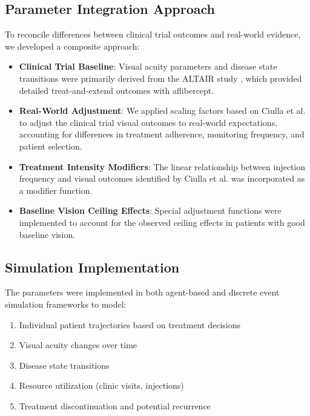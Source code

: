 \subsection{Parameter Integration Approach}

To reconcile differences between clinical trial outcomes and real-world evidence, we developed a composite approach:

\begin{itemize}
    \item \textbf{Clinical Trial Baseline}: Visual acuity parameters and disease state transitions were primarily derived from the ALTAIR study \citep{ohjiEfficacySafetyIntravitreal2020}, which provided detailed treat-and-extend outcomes with aflibercept.
    
    \item \textbf{Real-World Adjustment}: We applied scaling factors based on Ciulla et al. \citep{ciullaVisualAcuityOutcomes2020} to adjust the clinical trial visual outcomes to real-world expectations, accounting for differences in treatment adherence, monitoring frequency, and patient selection.
    
    \item \textbf{Treatment Intensity Modifiers}: The linear relationship between injection frequency and visual outcomes identified by Ciulla et al. \citep{ciullaVisualAcuityOutcomes2020} was incorporated as a modifier function.
    
    \item \textbf{Baseline Vision Ceiling Effects}: Special adjustment functions were implemented to account for the observed ceiling effects in patients with good baseline vision.
\end{itemize}

\subsection{Simulation Implementation}

The parameters were implemented in both agent-based and discrete event simulation frameworks to model:

\begin{enumerate}
    \item Individual patient trajectories based on treatment decisions
    \item Visual acuity changes over time
    \item Disease state transitions
    \item Resource utilization (clinic visits, injections)
    \item Treatment discontinuation and potential recurrence
\end{enumerate}


